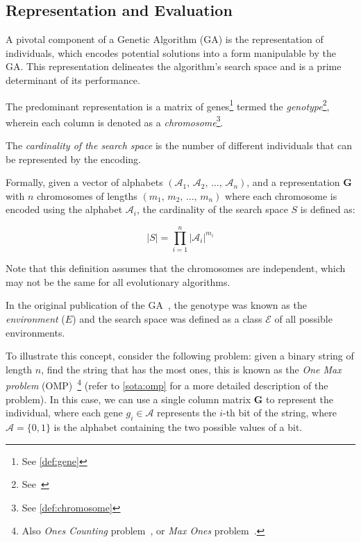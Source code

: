 \subsection{Representation and Evaluation}
\label{sec:bg:ga:repr}
  A pivotal component of a Genetic Algorithm (GA) is the representation of 
  individuals, which encodes potential solutions into a form manipulable by the 
  GA.
  This representation delineates the algorithm's search space and is a prime 
  determinant of its performance.

  The predominant representation is a matrix of genes\footnote{See 
  \vref{def:gene}} termed the \emph{genotype}\footnote{
    See~\autocite{wilhelmstotterJeneticsJavaGenetica}
  }, wherein each column is denoted as a \emph{chromosome}\footnote{
    See \vref{def:chromosome}
  }.

  \begin{definition}
  \label{def:cardinality_of_the_search_space}
    The \emph{cardinality of the search space} is the number of different 
    individuals that can be represented by the encoding.

    Formally, given a vector of alphabets \((\mathcal{A}_1,\, \mathcal{A}_2,\, 
    \dots,\, \mathcal{A}_n)\), and a representation \(\mathbf{G}\) with \(n\) 
    chromosomes of lengths \((m_1,\, m_2,\, \dots,\, m_n)\) where each 
    chromosome is encoded using the alphabet \(\mathcal{A}_i\), the cardinality 
    of the search space \(S\) is defined as:
    
    \begin{equation}
      \label{eq:cardinality_of_the_search_space}
      |S| = \prod_{i=1}^n |\mathcal{A}_i|^{m_i}
    \end{equation}

    Note that this definition assumes that the chromosomes are independent, 
    which may not be the same for all evolutionary algorithms.
  \end{definition}

  \begin{remark}
    In the original publication of the GA~\autocite{hollandAdaptationNaturalArtificial1992a},
    the genotype was known as the \emph{environment} (\(E\)) and the search 
    space was defined as a class \(\mathcal{E}\) of all possible environments.
  \end{remark}

  To illustrate this concept, consider the following problem: given a binary 
  string of length \(n\), find the string that has the most ones, this is known 
  as the \emph{One Max problem} 
  (OMP)~\autocite{andonovUnboundedKnapsackProblem2000}\footnote{
    Also \emph{Ones Counting} problem~\autocite{wilhelmstotterJeneticsJavaGenetica}, or \emph{Max Ones} problem~\autocite{ECJ}.
  } (refer to \vref{sota:omp} for a more detailed description of the problem).
  In this case, we can use a single column matrix \(\mathbf{G}\) to represent the individual, 
  where each gene \(g_i \in \mathcal{A}\) represents the \(i\)-th bit of the string, where 
  \(\mathcal{A} = \{0, 1\}\) is the alphabet containing the two possible values of a bit.
  
